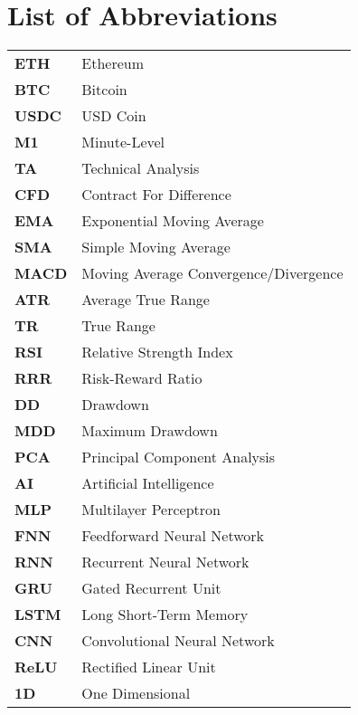\section*{List of Abbreviations}

\begin{tabularx}{\textwidth}{@{}lL{0.8\textwidth}@{}}
    \textbf{ETH}  & Ethereum                              \\
    \textbf{BTC}  & Bitcoin                               \\
    \textbf{USDC} & USD Coin                              \\
    \textbf{M1}   & Minute-Level                          \\


    \textbf{TA}   & Technical Analysis                    \\
    \textbf{CFD}  & Contract For Difference               \\
    \textbf{EMA}  & Exponential Moving Average            \\
    \textbf{SMA}  & Simple Moving Average                 \\
    \textbf{MACD} & Moving Average Convergence/Divergence \\
    \textbf{ATR}  & Average True Range                    \\
    \textbf{TR}   & True Range                            \\
    \textbf{RSI}  & Relative Strength Index               \\
    \textbf{RRR}  & Risk-Reward Ratio                     \\
    \textbf{DD}   & Drawdown                              \\
    \textbf{MDD}  & Maximum Drawdown                      \\

    \textbf{PCA}  & Principal Component Analysis          \\
    \textbf{AI}   & Artificial Intelligence               \\
    \textbf{MLP}  & Multilayer Perceptron                 \\
    \textbf{FNN}  & Feedforward Neural Network            \\
    \textbf{RNN}  & Recurrent Neural Network              \\
    \textbf{GRU}  & Gated Recurrent Unit                  \\
    \textbf{LSTM} & Long Short-Term Memory                \\
    \textbf{CNN}  & Convolutional Neural Network          \\
    \textbf{ReLU} & Rectified Linear Unit                 \\
    \textbf{1D}   & One Dimensional                       \\


\end{tabularx}

